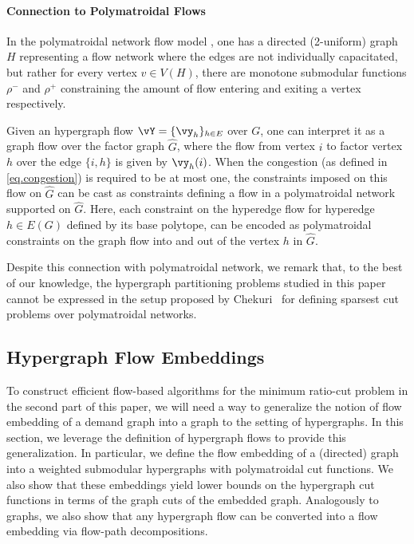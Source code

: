 \documentclass[letterpaper]{article}
\begin{document}
\paragraph{Connection to Polymatroidal Flows}  In the polymatroidal network flow model \cite{chekuri2012multicommodity, lawler1982computing}, one has a directed (2-uniform) graph $H$ representing a flow network where the edges are not individually capacitated, but rather for every vertex $v\in V(H)$, there are monotone submodular functions $\rho^-$ and $\rho^+$ constraining the amount of flow entering and exiting a vertex respectively.

Given an hypergraph flow $\vY=\{\vy_h\}_{h\in E}$ over $G$, one can interpret it as a graph flow over the factor graph $\hat{G}$, where the flow from vertex $i$ to factor vertex $h$ over the edge $\{i,h\}$ is given by $\vy_h(i)$. When the congestion (as defined in \eqref{eq.congestion}) is required to be at most one, the constraints imposed on this flow on $\hat{G}$ can be cast as constraints defining a flow in a polymatroidal network supported on $\hat{G}$. Here, each constraint on the hyperedge flow for hyperedge $h \in E(G)$ defined by its base polytope, can be encoded as polymatroidal constraints on the graph flow into and out of the vertex $h$ in $\hat{G}$.

Despite this connection with polymatroidal network, we remark that, to the best of our knowledge, the hypergraph partitioning problems studied in this paper cannot be expressed in the setup proposed by Chekuri~\cite{chekuri2012multicommodity} for defining sparsest cut problems over polymatroidal networks.


\subsection{Hypergraph Flow Embeddings}\label{sec.hypergraph.flow.embeddings}

To construct efficient flow-based algorithms for the minimum ratio-cut problem in the second part of this paper, we will need a way to generalize the notion of flow embedding of a demand graph into a graph to the setting of hypergraphs. In this section, we leverage the definition of hypergraph flows to provide this generalization. In particular, we  define the flow embedding of a (directed) graph into a weighted submodular hypergraphs with polymatroidal cut functions. We also show that these embeddings yield lower bounds on the hypergraph cut functions in terms of the graph cuts of the embedded graph. Analogously to graphs, we also show that any hypergraph flow can be converted into a flow embedding via flow-path decompositions.
\end{document}
